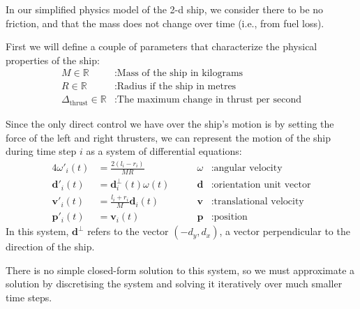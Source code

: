 \documentclass{report}
\begin{document}
In our simplified physics model of the 2-d ship, we consider there to be no friction,
and that the mass does not change over time (i.e., from fuel loss).

First we will define a couple of parameters that characterize the physical properties of
the ship:
\begin{align*}
    M \in \mathbb{R} &: \text{Mass of the ship in kilograms} \\
    R \in \mathbb{R} &: \text{Radius if the ship in metres} \\
    \Delta_\text{thrust} \in \mathbb{R} &: \text{The maximum change in thrust per second}
\end{align*}

Since the only direct control we have over the ship's motion is by setting the force of the
left and right thrusters, we can represent the motion of the ship during time step $i$
as a system of differential
equations:
\begin{alignat*}{4}
    \omega'_i(t) &= \frac{2(l_i - r_i)}{MR} & \qquad \omega &: \text{angular velocity} \\
    \mathbf{d}'_i(t) &= \mathbf{d}_i^{\perp}(t) \omega(t) & \qquad \mathbf{d} &: \text{orientation unit vector} \\
    \mathbf{v}'_i(t) &= \frac{l_i + r_i}{M} \mathbf{d}_i(t) & \qquad \mathbf{v} &: \text{translational velocity} \\
    \mathbf{p}'_i(t) &= \mathbf{v}_i(t) & \qquad \mathbf{p} &: \text{position}
\end{alignat*}
In this system, $\mathbf{d}^{\perp}$ refers to the vector $(-d_y, d_x)$, a vector perpendicular to
the direction of the ship. 

There is no simple closed-form solution to this system, so we must approximate a solution
by discretising the system and solving it iteratively over much smaller time steps.
\end{document}
